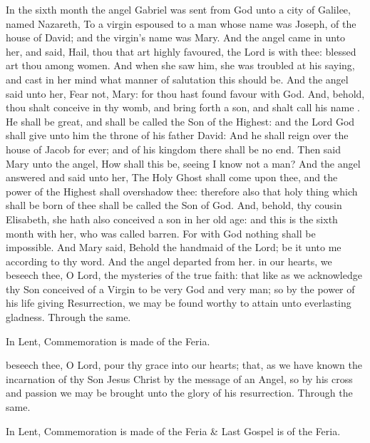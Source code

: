  In the sixth month the angel Gabriel was sent from God unto a city of Galilee, named Nazareth, To a virgin espoused to a man whose name was Joseph, of the house of David; and the virgin's name was Mary. And the angel came in unto her, and said, Hail, thou that art highly favoured, the Lord is with thee: blessed art thou among women. And when she saw him, she was troubled at his saying, and cast in her mind what manner of salutation this should be. And the angel said unto her, Fear not, Mary: for thou hast found favour with God. And, behold, thou shalt conceive in thy womb, and bring forth a son, and shalt call his name . He shall be great, and shall be called the Son of the Highest: and the Lord God shall give unto him the throne of his father David: And he shall reign over the house of Jacob for ever; and of his kingdom there shall be no end. Then said Mary unto the angel, How shall this be, seeing I know not a man? And the angel answered and said unto her, The Holy Ghost shall come upon thee, and the power of the Highest shall overshadow thee: therefore also that holy thing which shall be born of thee shall be called the Son of God. And, behold, thy cousin Elisabeth, she hath also conceived a son in her old age: and this is the sixth month with her, who was called barren. For with God nothing shall be impossible. And Mary said, Behold the handmaid of the Lord; be it unto me according to thy word. And the angel departed from her.
\secret
{} in our hearts, we beseech thee, O Lord, the mysteries of the true faith: that like as we acknowledge thy Son conceived of a Virgin to be very God and very man; so by the power of his life giving Resurrection, we may be found worthy to attain unto everlasting gladness. Through the same.
\begin{rubric}
    In Lent, Commemoration is made of the Feria.%
\end{rubric}
\postcommunion
{} beseech thee, O Lord, pour thy grace into our hearts; that, as we have known the incarnation of thy Son Jesus Christ by the message of an Angel, so by his cross and passion we may be brought unto the glory of his resurrection. Through the same.
\begin{rubric}
    In Lent, Commemoration is made of the Feria \& Last Gospel is of the Feria.
\end{rubric}

